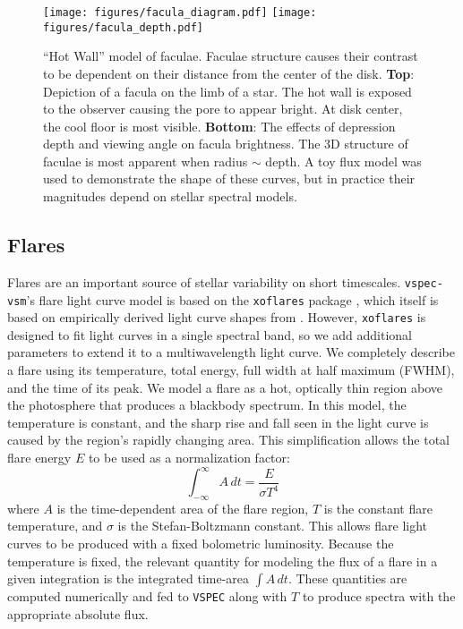 \documentclass[linenumbers,preprint,authoryear]{elsarticle}
\newcommand{\vspec}[1]{\texttt{VSPEC}#1}
\begin{document}
\begin{figure}
    \centering
    \texttt{[image: figures/facula\_diagram.pdf]}
    \texttt{[image: figures/facula\_depth.pdf]}
    \caption{
        ``Hot Wall'' model of faculae. Faculae structure causes their contrast to be dependent on their distance from the center of the disk. {\bf Top}: Depiction of a facula on the limb of a star. The hot wall is exposed to the observer causing the pore to appear bright. At disk center, the cool floor is most visible. {\bf Bottom}: The effects of depression depth and viewing angle on facula brightness. The 3D structure of faculae is most apparent when radius $\sim$ depth. A toy flux model was used to demonstrate the shape of these curves, but in practice their magnitudes depend on stellar spectral models.
        }
    \label{fig:fac_struct}
\end{figure}

\subsection{Flares \label{subsec:flares}}
Flares are an important source of stellar variability on short timescales. \texttt{vspec-vsm}'s flare light curve model is based on the \texttt{xoflares} package \citep{barclay2020}, which itself is based on empirically derived light curve shapes from \citet{davenport2016}. However, \texttt{xoflares} is designed to fit light curves in a single spectral band, so we add additional parameters to extend it to a multiwavelength light curve. We completely describe a flare using its temperature, total energy, full width at half maximum (FWHM), and the time of its peak. We model a flare as a hot, optically thin region above the photosphere that produces a blackbody spectrum. In this model, the temperature is constant, and the sharp rise and fall seen in the light curve is caused by the region's rapidly changing area. This simplification allows the total flare energy $E$ to be used as a normalization factor:
\begin{equation}
    \int_{-\infty}^{\infty}A\,dt = \frac{E}{\sigma T^4}
\end{equation}
where $A$ is the time-dependent area of the flare region, $T$ is the constant flare temperature, and $\sigma$ is the Stefan-Boltzmann constant. This allows flare light curves to be produced with a fixed bolometric luminosity. Because the temperature is fixed, the relevant quantity for modeling the flux of a flare in a given integration is the integrated time-area $\int A\,dt$. These quantities are computed numerically and fed to \vspec{} along with $T$ to produce spectra with the appropriate absolute flux.
\end{document}
